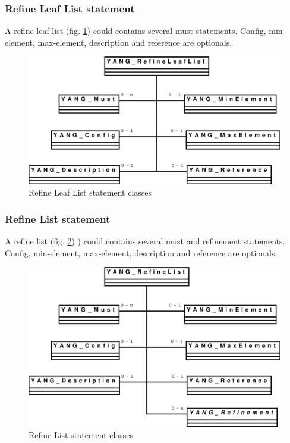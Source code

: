 \documentclass[a4paper]{article}
\begin{document}
\subsubsection{Refine Leaf List statement}

A refine leaf list  (fig. \ref{refineleaflist}) could contains several
must  statements. Config,  min-element,  max-element, description  and
reference are optionals.
\begin{figure}[htbp]
\begin{center}
\includegraphics[scale = .3]{refineleaflist.eps}
\end{center}
\caption{Refine Leaf List statement classes}
\label{refineleaflist}
\end{figure}

\subsubsection{Refine List statement}

A refine  list (fig. \ref{refinelist})  ) could contains  several must
and   refinement   statements.   Config,   min-element,   max-element,
description and reference are optionals.
\begin{figure}[htbp]
\begin{center}
\includegraphics[scale = .3]{refinelist.eps}
\end{center}
\caption{Refine List statement classes}
\label{refinelist}
\end{figure}
\end{document}

